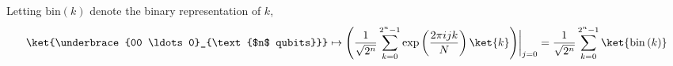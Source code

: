 \begingroup
\newcommand{\expo}[1]{\exp \left( #1 \right)}
%
\par Letting $\mathrm{bin} \left( k \right)$ denote the binary representation of $k$,
$$
\ket{\underbrace{00 \ldots 0}_{\text{$n$ qubits}}} \mapsto \left( \frac{1}{\sqrt{2^n}} \sum_{k=0}^{2^n-1}{\expo{\frac{2 \pi i j k}{N}} \ket{k}} \right) \biggr\rvert_{\substack{j=0}} = \frac{1}{\sqrt{2^n}} \sum_{k=0}^{2^n-1}{\ket{\mathrm{bin} \left( k \right)}}
$$
%
\endgroup

